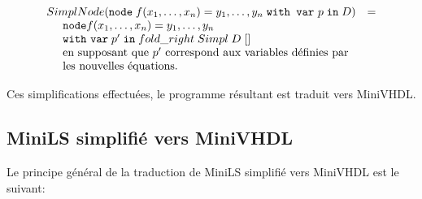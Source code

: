 \documentclass[a4paper]{article}
\newcommand{\minils}{{\sc MiniLS}}
\newcommand{\minivhdl}{{\sc MiniVHDL}}
\newcommand{\mybox}[1]{\mbox{\tt{#1}}}
\newcommand{\ind}[0]{\hspace{0.5cm}}
\newcommand{\Node}[4]{\mybox{node} \; f(#1) = #2 \; \mybox{with var} \
  #3 \; \mybox{in} \; #4}
\begin{document}
\[
\begin{array}{ll}
  \simplnd{\Node{x_1,\dots,x_n}{y_1,\dots,y_n}{p}{D}} & = \\
  \ind \mathtt{node} f(x_1,\dots,x_n) = y_1, \dots, y_n \; \\
  \ind \mathtt{with} \  \mathtt{var} \; p' \; \mathtt{in} \; fold\_right \;Simpl
  \; D \; [] \\
  \ind \mbox{en supposant que $p'$ correspond
             aux variables d\'efinies par} \\ \ind \mbox{les nouvelles \'equations.}
\end{array}
\]

Ces simplifications effectu\'ees, le programme r\'esultant est traduit vers \minivhdl.

\subsection{MiniLS simplifi\'e vers MiniVHDL}

Le principe g\'en\'eral de la traduction de \minils{} simplifi\'e vers
\minivhdl{} est le suivant:
\end{document}
